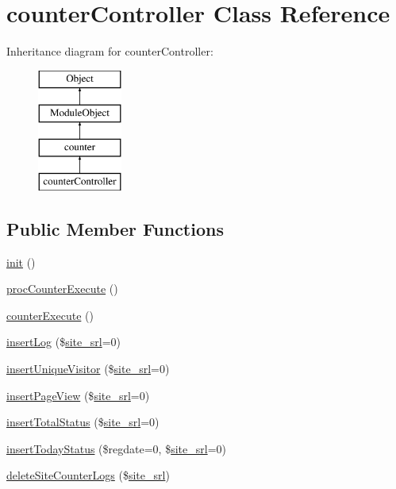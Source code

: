 \hypertarget{classcounterController}{}\section{counter\+Controller Class Reference}
\label{classcounterController}
Inheritance diagram for counter\+Controller\+:\begin{figure}[H]
\begin{center}
\leavevmode
\includegraphics[height=4.000000cm]{classcounterController}
\end{center}
\end{figure}
\subsection*{Public Member Functions}
\begin{DoxyCompactItemize}
\item 
\hyperlink{classcounterController_a38b5221a33984da33543a4b48ea739dd}{init} ()
\item 
\hyperlink{classcounterController_ab15b7e62975f84fb59f166e65eb79701}{proc\+Counter\+Execute} ()
\item 
\hyperlink{classcounterController_ad088e584257571fffd0ea9153c676a7f}{counter\+Execute} ()
\item 
\hyperlink{classcounterController_a047bffeaae0a0e5ebe6b50225db29ef9}{insert\+Log} (\$\hyperlink{ko_8install_8php_a8b1406b4ad1048041558dce6bfe89004}{site\+\_\+srl}=0)
\item 
\hyperlink{classcounterController_a5801722c5ab169c3d698fa596686c459}{insert\+Unique\+Visitor} (\$\hyperlink{ko_8install_8php_a8b1406b4ad1048041558dce6bfe89004}{site\+\_\+srl}=0)
\item 
\hyperlink{classcounterController_a7e7bfcdabc8855e8fe6835eaaa2c7168}{insert\+Page\+View} (\$\hyperlink{ko_8install_8php_a8b1406b4ad1048041558dce6bfe89004}{site\+\_\+srl}=0)
\item 
\hyperlink{classcounterController_aae80270e1f6fae002f8e5ae4a0a670d7}{insert\+Total\+Status} (\$\hyperlink{ko_8install_8php_a8b1406b4ad1048041558dce6bfe89004}{site\+\_\+srl}=0)
\item 
\hyperlink{classcounterController_aff29d33d56116a804589d86b883e83dc}{insert\+Today\+Status} (\$regdate=0, \$\hyperlink{ko_8install_8php_a8b1406b4ad1048041558dce6bfe89004}{site\+\_\+srl}=0)
\item 
\hyperlink{classcounterController_a27eebacfe75ed149166d010af2320faf}{delete\+Site\+Counter\+Logs} (\$\hyperlink{ko_8install_8php_a8b1406b4ad1048041558dce6bfe89004}{site\+\_\+srl})
\end{DoxyCompactItemize}
